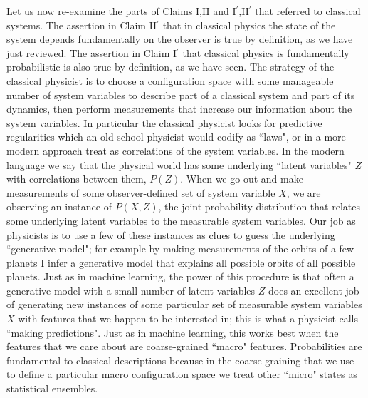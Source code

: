 \documentclass[a4paper,11pt]{article}
\begin{document}
Let us now re-examine the parts of Claims I,II and I$^\prime$,II$^\prime$ that referred to classical systems. The assertion in Claim II$^\prime$ that
in classical physics the state of the system depends fundamentally on the observer is true by definition, as we have just reviewed.
The assertion in Claim I$^\prime$ that classical physics is fundamentally probabilistic is also true by definition, as we have seen.
The strategy of the classical physicist is to choose a configuration space with some manageable number of
system variables to describe part of a classical system and part of its dynamics, then perform measurements that increase our information
about the system variables. In particular the classical physicist looks for predictive regularities which an old school physicist would codify as ``laws", 
or in a more modern approach treat as correlations of the system variables. In the modern language we say that the physical world
has some underlying ``latent variables" $Z$ with correlations between them, $P(Z)$. When we go out and make measurements of some
observer-defined  set of system variable $X$, we are observing an instance of $P(X,Z)$, the joint probability distribution that relates 
some underlying latent variables to the measurable  system variables. Our job as physicists is to use a few of these instances as clues
to guess the underlying ``generative model"; for example by making measurements of the orbits of a few planets I infer a generative model
that explains all possible orbits of all possible planets. Just as in machine learning, the power of this procedure is that often a generative model
with a small number of latent variables $Z$ does an excellent job of generating new instances of some particular set of measurable system
variables $X$ with features that we happen to be interested in; this is what a physicist calls ``making predictions". Just as in machine learning,
this works best when the features that we care about are coarse-grained ``macro" features.
Probabilities are fundamental to classical descriptions
because in the coarse-graining that we use to define a particular macro configuration space we treat other ``micro" states as statistical
ensembles. 
\end{document}
